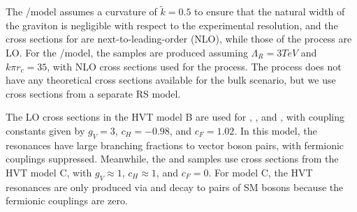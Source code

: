 The \ggF/\VBF\GBulktoWW model assumes a curvature of $\tilde{k}=0.5$ to ensure that the natural width of the graviton is negligible with respect to the experimental resolution, and the cross sections for \ggF\GBulktoWW are next-to-leading-order (NLO), while those of the \VBF process are LO.
For the \ggF/\VBF\RadtoWW model, the samples are produced assuming $\Lambda_{R}=3\unit{TeV}$ and $k\pi r_c=35$, with NLO cross sections used for the \ggF process.
The \VBF process does not have any theoretical cross sections available for the bulk scenario, but we use cross sections from a separate RS model.

The LO cross sections in the HVT model B are used for \DY\ZprtoWW, \DY\WprtoWZ, and \DY\WprtoWH, with coupling constants given by $g_V=3$, $c_H=-0.98$, and $c_F=1.02$.
In this model, the resonances have large branching fractions to vector boson pairs, with fermionic couplings suppressed.
Meanwhile, the \VBF\ZprtoWW and \DY\WprtoWZ samples use cross sections from the HVT model C, with $g_V\approx1$, $c_H\approx1$, and $c_F=0$.%
For model C, the HVT resonances are only produced via \VBF and decay to pairs of SM bosons because the fermionic couplings are zero.

